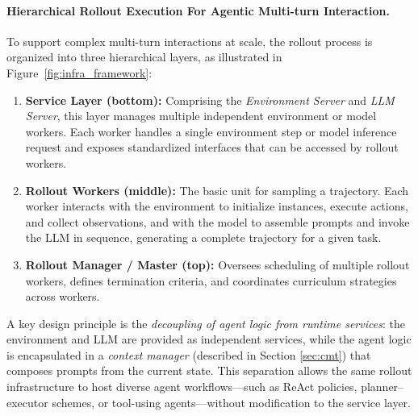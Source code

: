 \paragraph{Hierarchical Rollout Execution For Agentic Multi-turn Interaction.}
To support complex multi-turn interactions at scale, the rollout process is organized into three hierarchical layers, as illustrated in Figure~\ref{fig:infra_framework}:
\begin{enumerate}
\item \textbf{Service Layer (bottom):} Comprising the \emph{Environment Server} and \emph{LLM Server}, this layer manages multiple independent environment or model workers.
Each worker handles a single environment step or model inference request and exposes standardized interfaces that can be accessed by rollout workers.
\item \textbf{Rollout Workers (middle):} The basic unit for sampling a trajectory.
Each worker interacts with the environment to initialize instances, execute actions, and collect observations, and with the model to assemble prompts and invoke the LLM in sequence, generating a complete trajectory for a given task.
\item \textbf{Rollout Manager / Master (top):} Oversees scheduling of multiple rollout workers, defines termination criteria, and coordinates curriculum strategies across workers.
\end{enumerate}
A key design principle is the \emph{decoupling of agent logic from runtime services}: the environment and LLM are provided as independent services, while the agent logic is encapsulated in a \emph{context manager} (described in Section \ref{sec:cmt}) that composes prompts from the current state.
This separation allows the same rollout infrastructure to host diverse agent workflows—such as ReAct policies, planner–executor schemes, or tool-using agents—without modification to the service layer.

